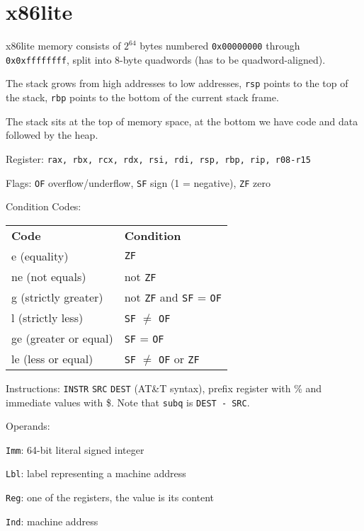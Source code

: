 \section*{x86lite}

x86lite memory consists of $2^{64}$ bytes numbered \texttt{0x00000000} through \texttt{0x0xffffffff}, split into 8-byte quadwords (has to be quadword-aligned). \medskip

The stack grows from high addresses to low addresses, \texttt{rsp} points to the top of the stack, \texttt{rbp} points to the bottom of the current stack frame. \medskip

The stack sits at the top of memory space, at the bottom we have code and data followed by the heap.\medskip

Register: \texttt{rax, rbx, rcx, rdx, rsi, rdi, rsp, rbp, rip, r08-r15}\medskip

Flags: \texttt{OF} overflow/underflow, \texttt{SF} sign (1 = negative), \texttt{ZF} zero \medskip

Condition Codes:
\begin{center}
	\begin{tabular}{l l}
		\textbf{Code}         & \textbf{Condition}                            \\
		e (equality)          & \texttt{ZF}                                   \\
		ne (not equals)       & not \texttt{ZF}                               \\
		g (strictly greater)  & not \texttt{ZF} and \texttt{SF} = \texttt{OF} \\
		l (strictly less)     & \texttt{SF} $\neq$ \texttt{OF}                \\
		ge (greater or equal) & \texttt{SF} = \texttt{OF}                     \\
		le (less or equal)    & \texttt{SF} $\neq$ \texttt{OF} or \texttt{ZF} \\
	\end{tabular}
\end{center}

Instructions: \texttt{INSTR} \texttt{SRC} \texttt{DEST} (AT\&T syntax), prefix register with \% and immediate values with \$. Note that \texttt{subq} is \texttt{DEST - SRC}.\medskip

Operands:
\begin{compactitem}[$\quad\bullet$]
	\item \texttt{Imm}: 64-bit literal signed integer
	\item \texttt{Lbl}: label representing a machine address
	\item \texttt{Reg}: one of the registers, the value is its content
	\item \texttt{Ind}: machine address
\end{compactitem} \medskip

